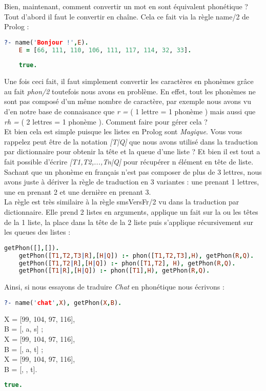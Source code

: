 \documentclass[11pt]{book}
\begin{document}
	Bien, maintenant, comment convertir un mot en sont équivalent phonétique ? Tout d'abord il faut le convertir en chaîne. Cela ce fait via la règle name/2 de Prolog :
	
	\begin{lstlisting}[language=Prolog]
	?- name('Bonjour !',E). 
	E = [66, 111, 110, 106, 111, 117, 114, 32, 33].
	
	true.
	\end{lstlisting}
	
	Une fois ceci fait, il faut simplement convertir les caractères en phonèmes grâce au fait {\em phon/2} toutefois nous avons en problème. En effet, tout les phonèmes ne sont pas composé d'un même nombre de caractère, par exemple nous avons vu d'en notre base de connaisance que {\em r = } ( 1 lettre = 1 phonème ) mais aussi que {\em rh = } ( 2 lettres = 1 phonème ). Comment faire pour gérer cela ?\\
	Et bien cela est simple puisque les listes en Prolog sont {\em Magique}. Vous vous rappelez peut être de la notation {\em [T|Q]} que nous avons utilisé dans la traduction par dictionnaire pour obtenir la tête et la queue d'une liste ? Et bien il est tout a fait possible d'écrire {\em [T1,T2,...,Tn|Q]} pour récupérer n élément en tête de liste.\\
	Sachant que un phonème en français n'est pas composer de plus de 3 lettres, nous avons juste à dériver la règle de traduction en 3 variantes : une prenant 1 lettres, une en prenant 2 et une dernière en prenant 3.\\ 
	La règle est très similaire à la règle smsVersFr/2 vu dans la traduction par dictionnaire. Elle prend 2 listes en arguments, applique un fait sur la ou les têtes de la 1 liste, la place dans la tête de la 2 liste puis s'applique récursivement sur les queues des listes :
	
	\begin{lstlisting}[language=Prolog]
	getPhon([],[]).
	getPhon([T1,T2,T3|R],[H|Q]) :- phon([T1,T2,T3],H), getPhon(R,Q).
	getPhon([T1,T2|R],[H|Q]) :- phon([T1,T2], H), getPhon(R,Q).
	getPhon([T1|R],[H|Q]) :- phon([T1],H), getPhon(R,Q).
	\end{lstlisting}
	
	Ainsi, si nous essayons de traduire {\em Chat} en phonétique nous écrivons :
	\begin{lstlisting}[language=Prolog]
	?- name('chat',X), getPhon(X,B).
	\end{lstlisting}
	\indent \indent \indent \indent X = [99, 104, 97, 116],\\
	\indent \indent \indent B = [, a, s] ;\\
	\indent \indent \indent X = [99, 104, 97, 116],\\
	\indent \indent \indent B = [, a, t] ;\\
	\indent \indent \indent X = [99, 104, 97, 116],\\
	\indent \indent \indent B = [, , t].\\
	\begin{lstlisting}[language=Prolog]
	true.
	\end{lstlisting}
	
\end{document}
